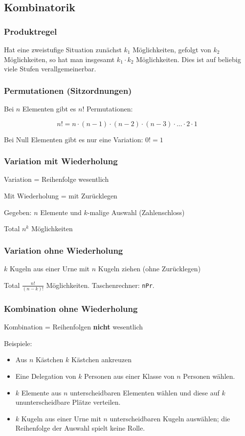 \begin{multicols}{2}
\subsection{Kombinatorik}

\subsubsection{Produktregel}
Hat eine zweistufige Situation zunächst $k_1$ Möglichkeiten, gefolgt
von $k_2$ Möglichkeiten, so hat man insgesamt $k_1\cdot{}k_2$
Möglichkeiten. Dies ist auf beliebig viele Stufen verallgemeinerbar.

\subsubsection{Permutationen (Sitzordnungen)}

Bei $n$ Elementen gibt es $n!$ Permutationen:

$$n! = n\cdot{}(n-1)\cdot{}(n-2)\cdot{}(n-3)\cdot{} ... \cdot{}2\cdot{}1$$

Bei Null Elementen gibt es nur eine Variation: $0! = 1$


\subsubsection{Variation mit Wiederholung}
Variation = Reihenfolge wesentlich

Mit Wiederholung = mit Zurücklegen

Gegeben: $n$ Elemente und $k$-malige Auswahl
(\zB Zahlenschloss)

Total $n^k$ Möglichkeiten

\subsubsection{Variation ohne Wiederholung}
$k$ Kugeln aus einer Urne mit $n$ Kugeln ziehen (ohne Zurücklegen)

Total $\frac{n!}{(n-k)!}$ Möglichkeiten. Taschenrechner: \texttt{nPr}. 

\subsubsection{Kombination ohne Wiederholung}
Kombination = Reihenfolgen \textbf{nicht} wesentlich

Beispiele:

\begin{itemize}
\item Aus $n$ Kästchen $k$ Kästchen ankreuzen
\item Eine Delegation von $k$ Personen aus einer Klasse von $n$
Personen wählen.
\item $k$ Elemente aus $n$ unterscheidbaren Elementen wählen und diese
auf $k$ ununterscheidbare Plätze verteilen.
\item $k$ Kugeln aus einer Urne mit $n$ unterscheidbaren Kugeln
auswählen; die Reihenfolge der Auswahl spielt keine Rolle.
\end{itemize}


\end{multicols}
